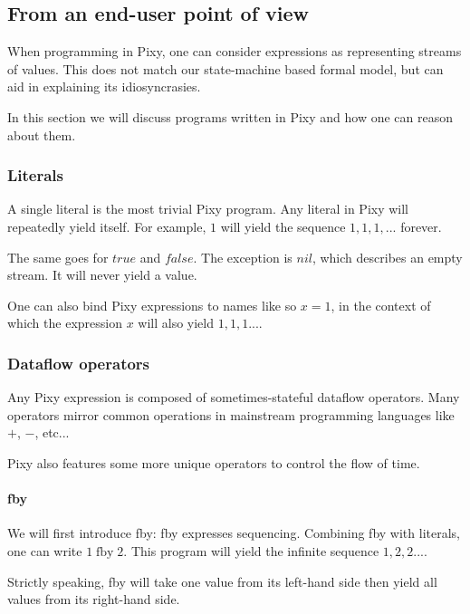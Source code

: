 \documentclass{scrartcl}
\DeclareMathOperator{\fby}{fby}
\begin{document}
    \subsection{From an end-user point of view}
    
    When programming in Pixy, one can consider expressions as representing streams of values. This does not match our state-machine based formal model, but can aid in explaining its idiosyncrasies.
    
    In this section we will discuss programs written in Pixy and how one can reason about them.
    
    \subsubsection{Literals}
    
    A single literal is the most trivial Pixy program. Any literal in Pixy will repeatedly yield itself. For example, $1$ will yield the sequence $1, 1, 1, ...$ forever.
    
    The same goes for $true$ and $false$. The exception is $nil$, which describes an empty stream. It will never yield a value.
    
    One can also bind Pixy expressions to names like so $x = 1$, in the context of which the expression $x$ will also yield $1, 1, 1 ...$.
    
    \subsubsection{Dataflow operators}
    
    Any Pixy expression is composed of sometimes-stateful dataflow operators. Many operators mirror common operations in mainstream programming languages like $+$, $-$, etc...
    
    Pixy also features some more unique operators to control the flow of time.
    
    \paragraph{fby}
    
    We will first introduce fby: fby expresses sequencing. Combining fby with literals, one can write $1 \fby 2$. This program will yield the infinite sequence $1, 2, 2 ...$.
    
    Strictly speaking, fby will take one value from its left-hand side then yield all values from its right-hand side.
    
\end{document}
